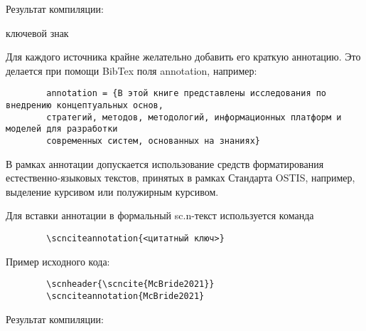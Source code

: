 \begin{textitemize}
	Результат компиляции:
	
	\begin{SCn}
		\begin{scnreltolist}{ключевой знак}
		\end{scnreltolist}
	\end{SCn}
	
	\item Для каждого источника крайне желательно добавить его краткую аннотацию. Это делается при помощи BibTex поля annotation, например:
	
	\begin{verbatim}
		annotation = {В этой книге представлены исследования по внедрению концептуальных основ,
		стратегий, методов, методологий, информационных платформ и моделей для разработки 
		современных систем, основанных на знаниях}
	\end{verbatim}
	
	В рамках аннотации допускается использование средств форматирования естественно-языковых текстов, принятых в рамках Стандарта OSTIS, например, выделение курсивом или полужирным курсивом.
	
	Для вставки аннотации в формальный sc.n-текст используется команда
	
	\begin{verbatim}
		\scnciteannotation{<цитатный ключ>}
	\end{verbatim}
	
	Пример исходного кода:
	
	\begin{verbatim}
		\scnheader{\scncite{McBride2021}}
		\scnciteannotation{McBride2021}
	\end{verbatim}
	
	Результат компиляции:
	
	
\end{textitemize}

\newpage
